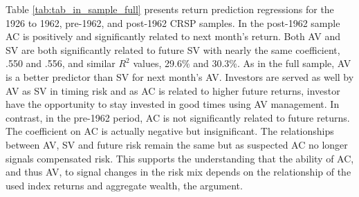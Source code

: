 
Table \ref{tab:tab_in_sample_full} presents return prediction regressions for the 1926 to 1962, pre-1962, and post-1962 CRSP samples. In the post-1962 sample AC is positively and significantly related to next month's return. Both AV and SV are both significantly related to future SV with nearly the same coefficient, .550 and .556, and similar $R^{2}$ values, 29.6\% and 30.3\%. As in the full sample, AV is a better predictor than SV for next month's AV. Investors are served as well by AV as SV in timing risk and as AC is related to higher future returns, investor have the opportunity to stay invested in good times using AV management. In contrast, in the pre-1962 period, AC is not significantly related to future returns. The coefficient on AC is actually negative but insignificant. The relationships between AV, SV and future risk remain the same but as suspected AC no longer signals compensated risk. This supports the understanding that the ability of AC, and thus AV, to signal changes in the risk mix depends on the relationship of the used index returns and aggregate wealth, the \citet{pollet_average_2010} argument.

